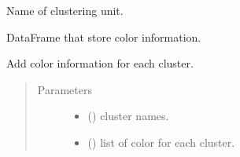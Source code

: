\documentclass[letterpaper,10pt,english]{sphinxmanual}
\begin{document}
\begin{fulllineitems}

\begin{fulllineitems}
\label{\detokenize{modules/celloracle:celloracle.Links.name}}
 \textendash{} Name of clustering unit.

\end{fulllineitems}


\begin{fulllineitems}
\label{\detokenize{modules/celloracle:celloracle.Links.palette}}
 \textendash{} DataFrame that store color information.

\end{fulllineitems}


\begin{fulllineitems}
\label{\detokenize{modules/celloracle:celloracle.Links.add_palette}}
Add color information for each cluster.
\begin{quote}\begin{description}
\item[{Parameters}] \leavevmode\begin{itemize}
\item {} 
 () \textendash{} cluster names.

\item {} 
 () \textendash{} list of color for each cluster.

\end{itemize}

\end{description}\end{quote}

\end{fulllineitems}



\end{fulllineitems}
\end{document}
